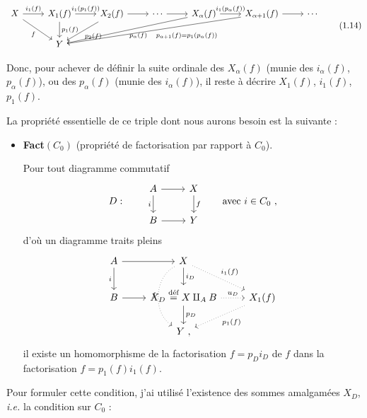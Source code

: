 
\[
\begin{tikzcd}[column sep=normal]
X \arrow[r, "i_1(f)"] \arrow[dr, "f"'] & X_1(f) \arrow[r, "i_1(p_1(f))"] \arrow[d, "p_1(f)"] & X_2(f) \arrow[r] \arrow[dl, "p_2(f)"] & \cdots \arrow[r] & X_\alpha(f) \arrow[r, "i_1(p_\alpha(f))"] \arrow[dlll, "p_\alpha(f)"] & X_{\alpha+1}(f) \arrow[r] \arrow[dllll, "p_{\alpha+1}(f) = p_1(p_\alpha(f))"] & \cdots \\
 & Y & & & & &
\end{tikzcd}
\tag*{(1.14)}
\]

Donc, pour achever de définir la suite ordinale des $X_\alpha(f)$ (munie des $i_\alpha(f)$, $p_\alpha(f)$), ou des $p_\alpha(f)$ (munie des $i_\alpha(f)$), il reste à décrire $X_1(f)$, $i_1(f)$, $p_1(f)$.

La propriété essentielle de ce triple dont nous aurons besoin est la suivante :

\begin{itemize}[leftmargin=5em, labelwidth=4em, labelsep=1em, align=left]
\item[(1.15)] \textbf{Fact}$(C_0)$ (propriété de factorisation par rapport à $C_0$).

Pour tout diagramme commutatif
\[
D : \qquad
\begin{tikzcd}
A \arrow[r] \arrow[d, "i"'] & X \arrow[d, "f"] \\
B \arrow[r] & Y
\end{tikzcd}
\qquad \text{avec } i \in C_0 \ ,
\]
d'où un diagramme traits pleins
\[
\begin{tikzcd}
A \arrow[r] \arrow[d, "i"'] & X \arrow[d, "i_D"] \arrow[dr, dotted, "i_1(f)"] \arrow[dd, dotted, bend right=60, "f"'] & \\
B \arrow[r] & X_D \overset{\text{déf}}{=} X \amalg_A B \arrow[r, dotted, "u_D"] \arrow[d, "p_D"] & X_1(f) \arrow[dl, dotted, "p_1(f)"] \\
 & Y \ , &
\end{tikzcd}
\]
il existe un homomorphisme de la factorisation $f = p_D i_D$ de $f$ dans la factorisation $f = p_1(f)i_1(f)$.
\end{itemize}

Pour formuler cette condition, j'ai utilisé l'existence des sommes amalgamées $X_D$, \textit{i.e.} la condition sur $C_0$ :


